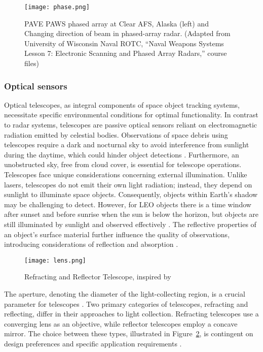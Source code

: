 \begin{figure}[h!]
	\centering
	\texttt{[image: phase.png]}
	\caption{ PAVE PAWS phased array at Clear AFS, Alaska (left) \cite{monostat} and  Changing direction of beam in phased-array radar. (Adapted from University of Wisconsin Naval 
  ROTC, “Naval Weapons Systems Lesson 7: Electronic Scanning and Phased Array Radars,” course files) \cite{usssn}}\label{fig:phased}
\end{figure}

\subsubsection{Optical sensors}

Optical telescopes, as integral components of space object tracking systems, necessitate specific environmental conditions for optimal functionality. In contrast to radar systems, telescopes are passive optical sensors reliant on electromagnetic radiation emitted by celestial bodies. Observations of space debris using telescopes require a dark and nocturnal sky to avoid interference from sunlight during the daytime, which could hinder object detections \cite{optical}. Furthermore, an unobstructed sky, free from cloud cover, is essential for telescope operations.\\

Telescopes face unique considerations concerning external illumination. Unlike lasers, telescopes do not emit their own light radiation; instead, they depend on sunlight to illuminate space objects. Consequently, objects within Earth's shadow may be challenging to detect. However, for LEO objects there is a time window after sunset and before sunrise when the sun is below the horizon, but objects are still illuminated by sunlight and observed effectively \cite{optical}. The reflective properties of an object's surface material further influence the quality of observations, introducing considerations of reflection and absorption \cite{optical}.\\

\begin{figure}[h!]
	\centering
	\texttt{[image: lens.png]}
	\caption{Refracting and Reflector Telescope, inspired by \cite{tele}}\label{fig:lensopt}
\end{figure}

The aperture, denoting the diameter of the light-collecting region, is a crucial parameter for telescopes \cite{astro}. Two primary categories of telescopes, refracting and reflecting, differ in their approaches to light collection. Refracting telescopes use a converging lens as an objective, while reflector telescopes employ a concave mirror. The choice between these types, illustrated in Figure~\ref{fig:lensopt}, is contingent on design preferences and specific application requirements \cite{astro}.\\

